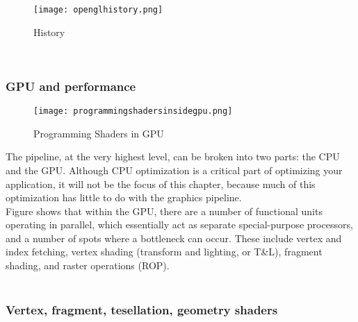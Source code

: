 \documentclass[onecolumn]{article}
\begin{document}
\begin{figure}[ht!]
\centering
\texttt{[image: openglhistory.png]}
\caption{History \label{}}
\end{figure}
\\

\subsubsection{GPU and performance}\label{sec:2.0.2}

\begin{figure}[ht!]
\centering
\texttt{[image: programmingshadersinsidegpu.png]}
\caption{Programming Shaders in GPU \label{}}
\end{figure}

The pipeline, at the very highest level, can be broken into two parts: the CPU and the GPU. Although CPU optimization is a critical part of optimizing your application, it will not be the focus of this chapter, because much of this optimization has little to do with the graphics pipeline.\\
Figure  shows that within the GPU, there are a number of functional units operating in parallel, which essentially act as separate special-purpose processors, and a number of spots where a bottleneck can occur. These include vertex and index fetching, vertex shading (transform and lighting, or T&L), fragment shading, and raster operations (ROP).\\\\




\subsubsection{Vertex, fragment, tesellation, geometry shaders}\label{sec:2.0.4}
\end{document}
